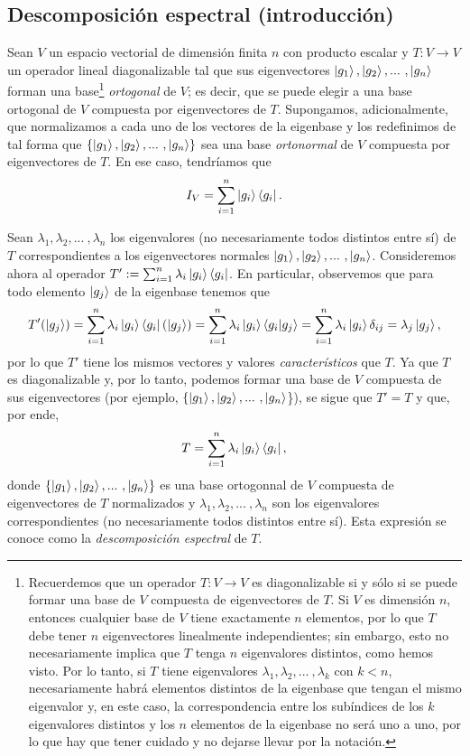 \documentclass[12pt,dvipsnames]{article}
\begin{document}
\subsection{Descomposición espectral (introducción)} \label{Subsec:Descomposición espectral (introducción)}

Sean $V$ un espacio vectorial de dimensión finita $n$ con producto escalar y $T:V\to V$ un operador lineal diagonalizable tal que sus eigenvectores $\ket{g_1},\ket{g_2},... \ ,\ket{g_n}$ forman una base\footnote{Recuerdemos que un operador $T:V\to V$ es diagonalizable si y sólo si se puede formar una base de $V$ compuesta de eigenvectores de $T$. Si $V$ es dimensión $n$, entonces cualquier base de $V$ tiene exactamente $n$ elementos, por lo que $T$ debe tener $n$ eigenvectores linealmente independientes; sin embargo, esto no necesariamente implica que $T$ tenga $n$ eigenvalores distintos, como hemos visto. Por lo tanto, si $T$ tiene eigenvalores $\lambda_1,\lambda_2,... \ ,\lambda_k$ con $k<n$, necesariamente habrá elementos distintos de la eigenbase que tengan el mismo eigenvalor y, en este caso, la correspondencia entre los subíndices de los $k$ eigenvalores distintos y los $n$ elementos de la eigenbase no será uno a uno, por lo que hay que tener cuidado y no dejarse llevar por la notación.} \emph{ortogonal} de $V$; es decir, que se puede elegir a una base ortogonal de $V$ compuesta por eigenvectores de $T$. Supongamos, adicionalmente, que normalizamos a cada uno de los vectores de la eigenbase y los redefinimos de tal forma que $\{\ket{g_1},\ket{g_2},... \ ,\ket{g_n}\}$ sea una base \emph{ortonormal} de $V$ compuesta por eigenvectores de $T$. En ese caso, tendríamos que \[
    I_V = \sum_{i=1}^n \ket{g_i}\bra{g_i}.
\] 

\vspace{3mm}
Sean $\lambda_1,\lambda_2,... \ ,\lambda_n$ los eigenvalores (no necesariamente todos distintos entre sí) de $T$ correspondientes a los eigenvectores normales $\ket{g_1},\ket{g_2},... \ ,\ket{g_n}$. Consideremos ahora al operador $T':=\sum_{i=1}^n \lambda_i \ket{g_i}\bra{g_i}$. En particular, observemos que para todo elemento $\ket{g_j}$ de la eigenbase tenemos que \[
    T'(\ket{g_j})=\sum_{i=1}^n \lambda_i \ket{g_i}\bra{g_i}(\ket{g_j})=\sum_{i=1}^n \lambda_i \ket{g_i}\braket{g_i|g_j}=\sum_{i=1}^n \lambda_i \ket{g_i}\delta_{ij}=\lambda_j \ket{g_j},
\] por lo que $T'$ tiene los mismos vectores y valores \emph{característicos} que $T$.  Ya que $T$ es diagonalizable y, por lo tanto, podemos formar una base de $V$ compuesta de sus eigenvectores (por ejemplo, $\{\ket{g_1},\ket{g_2},... \ ,\ket{g_n}$\}), se sigue que $T'=T$ y que, por ende, \[
T = \sum_{i=1}^n \lambda_i \ket{g_i}\bra{g_i},
\] donde $\{\ket{g_1},\ket{g_2},... \ ,\ket{g_n}\}$ es una base ortogonnal de $V$ compuesta de eigenvectores de $T$ normalizados y $\lambda_1,\lambda_2,... \ ,\lambda_n$ son los eigenvalores correspondientes (no necesariamente todos distintos entre sí). Esta expresión se conoce como la \emph{descomposición espectral} de $T$.
\end{document}
